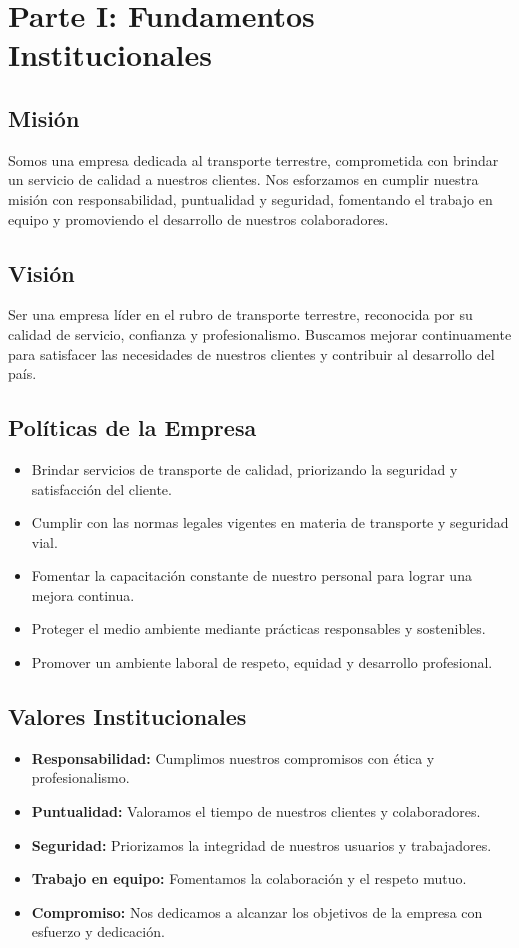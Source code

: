 \documentclass[a4paber,12pt]{article}
\begin{document}
	\section*{Parte I: Fundamentos Institucionales}
	
	\subsection{Misión}
	Somos una empresa dedicada al transporte terrestre, comprometida con brindar un servicio de calidad a nuestros clientes. Nos esforzamos en cumplir nuestra misión con responsabilidad, puntualidad y seguridad, fomentando el trabajo en equipo y promoviendo el desarrollo de nuestros colaboradores.
	
	\subsection{Visión}
	Ser una empresa líder en el rubro de transporte terrestre, reconocida por su calidad de servicio, confianza y profesionalismo. Buscamos mejorar continuamente para satisfacer las necesidades de nuestros clientes y contribuir al desarrollo del país.
	
	\subsection{Políticas de la Empresa}
	\begin{itemize}
		\item Brindar servicios de transporte de calidad, priorizando la seguridad y satisfacción del cliente.
		\item Cumplir con las normas legales vigentes en materia de transporte y seguridad vial.
		\item Fomentar la capacitación constante de nuestro personal para lograr una mejora continua.
		\item Proteger el medio ambiente mediante prácticas responsables y sostenibles.
		\item Promover un ambiente laboral de respeto, equidad y desarrollo profesional.
	\end{itemize}
	
	\subsection{Valores Institucionales}
	\begin{itemize}
		\item \textbf{Responsabilidad:} Cumplimos nuestros compromisos con ética y profesionalismo.
		\item \textbf{Puntualidad:} Valoramos el tiempo de nuestros clientes y colaboradores.
		\item \textbf{Seguridad:} Priorizamos la integridad de nuestros usuarios y trabajadores.
		\item \textbf{Trabajo en equipo:} Fomentamos la colaboración y el respeto mutuo.
		\item \textbf{Compromiso:} Nos dedicamos a alcanzar los objetivos de la empresa con esfuerzo y dedicación.
	\end{itemize}
	
\end{document}
